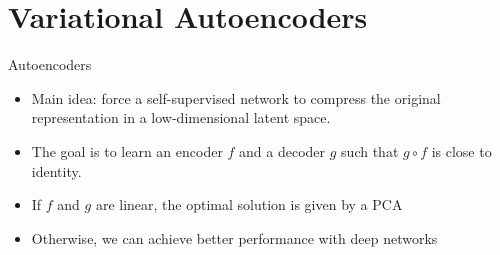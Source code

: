 \documentclass{beamer}
\begin{document}
\section{Variational Autoencoders}

\begin{frame}{Autoencoders}

    \begin{itemize}
        \item Main idea: force a self-supervised network to compress the original representation in a low-dimensional latent space.
    \end{itemize}

    \begin{figure}
        \centering
    \end{figure}
    \begin{itemize}
        \item The goal is to learn an encoder $f$ and a decoder $g$ such that $g \circ f$ is close to identity.
        \item If $f$ and $g$ are linear, the optimal solution is given by a PCA
        \item Otherwise, we can achieve better performance with deep networks
    \end{itemize}
\end{frame}
\end{document}
